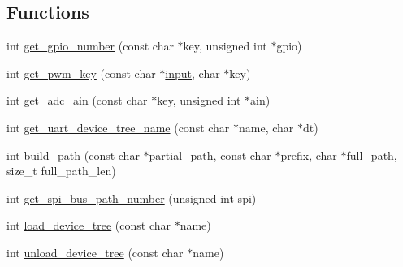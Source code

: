 \subsection*{Functions}
\begin{DoxyCompactItemize}
\item 
int \hyperlink{adafruit-beaglebone-io-python-master_2source_2common_8h_af07179e804fc4b09ca3d342ae9e0b47d}{get\+\_\+gpio\+\_\+number} (const char $\ast$key, unsigned int $\ast$gpio)
\item 
int \hyperlink{adafruit-beaglebone-io-python-master_2source_2common_8h_ab14caef9a565a5532c2d626f48613332}{get\+\_\+pwm\+\_\+key} (const char $\ast$\hyperlink{constants_8h_a1a68120273996c880f8fd414afd17eb4}{input}, char $\ast$key)
\item 
int \hyperlink{adafruit-beaglebone-io-python-master_2source_2common_8h_aefedfd4ecc35b4d762843191625e7b9b}{get\+\_\+adc\+\_\+ain} (const char $\ast$key, unsigned int $\ast$ain)
\item 
int \hyperlink{adafruit-beaglebone-io-python-master_2source_2common_8h_ac1764bec72b7cd3b4034a12b085ec7c0}{get\+\_\+uart\+\_\+device\+\_\+tree\+\_\+name} (const char $\ast$name, char $\ast$dt)
\item 
int \hyperlink{adafruit-beaglebone-io-python-master_2source_2common_8h_a75bc0039782c64fcdb774d927eedcaf2}{build\+\_\+path} (const char $\ast$partial\+\_\+path, const char $\ast$prefix, char $\ast$full\+\_\+path, size\+\_\+t full\+\_\+path\+\_\+len)
\item 
int \hyperlink{adafruit-beaglebone-io-python-master_2source_2common_8h_a2f5849b50c9fd1493c943ae1d0f14506}{get\+\_\+spi\+\_\+bus\+\_\+path\+\_\+number} (unsigned int spi)
\item 
int \hyperlink{adafruit-beaglebone-io-python-master_2source_2common_8h_ad65b05b7898949b1913ed1e018162b70}{load\+\_\+device\+\_\+tree} (const char $\ast$name)
\item 
int \hyperlink{adafruit-beaglebone-io-python-master_2source_2common_8h_ac56a1f43d3a4843560ed9559b85d7bb1}{unload\+\_\+device\+\_\+tree} (const char $\ast$name)
\end{DoxyCompactItemize}

